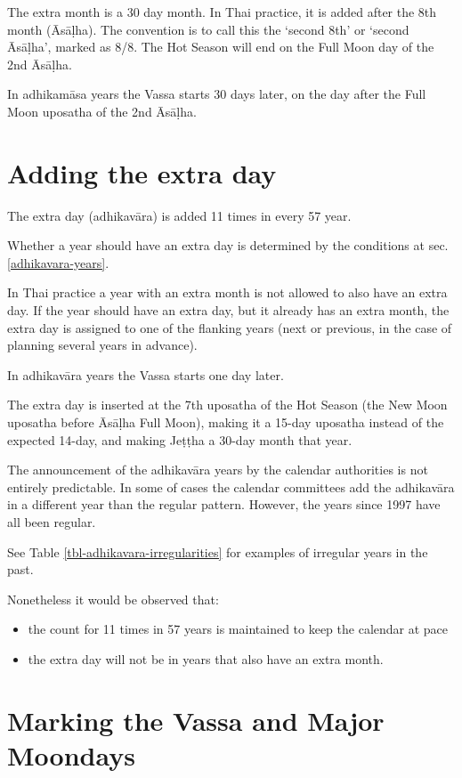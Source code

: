 \documentclass[11pt,oneside]{memoir-article}
\begin{document}
The extra month is a 30 day month. In Thai practice, it is added after the 8th
month (Āsāḷha). The convention is to call this the `second 8th' or `second
Āsāḷha', marked as 8/8. The Hot Season will end on the Full Moon day of the 2nd
Āsāḷha.

In adhikamāsa years the Vassa starts 30 days later, on the day after the Full
Moon uposatha of the 2nd Āsāḷha.

\section{Adding the extra day}
\label{sec-3-2}
\label{adding-extra-day}

The extra day (adhikavāra) is added 11 times in every 57 year.

Whether a year should have an extra day is determined by the conditions at
sec. \ref{adhikavara-years}.

In Thai practice a year with an extra month is not allowed to also
have an extra day. If the year should have an extra day, but it
already has an extra month, the extra day is assigned to one of the
flanking years (next or previous, in the case of planning several
years in advance).

In adhikavāra years the Vassa starts one day later.

The extra day is inserted at the 7th uposatha of the Hot Season (the New Moon
uposatha before Āsāḷha Full Moon), making it a 15-day uposatha instead of the
expected 14-day, and making Jeṭṭha a 30-day month that
year.\autocite{hasapannyo-zodiac}

The announcement of the adhikavāra years by the calendar authorities is not
entirely predictable. In some of cases the calendar committees add the
adhikavāra in a different year than the regular pattern. However, the years
since 1997 have all been regular.

See Table \ref{tbl-adhikavara-irregularities} for examples of irregular years in the past.

Nonetheless it would be observed that:

\begin{itemize}
\item the count for 11 times in 57 years is maintained to keep the
calendar at pace
\item the extra day will not be in years that also have an extra month.
\end{itemize}

\section{Marking the Vassa and Major Moondays}
\label{sec-3-3}
\end{document}

